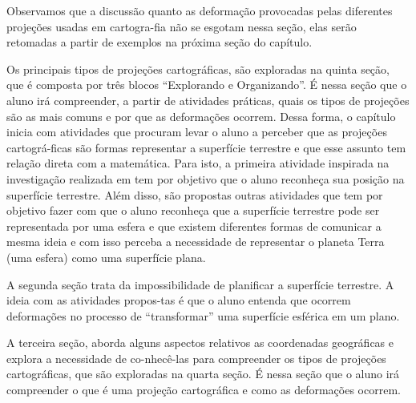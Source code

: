 \begin{apresentacao}
{Observamos que a discussão quanto as deformação provocadas pelas diferentes projeções usadas em cartogra-fia não se esgotam nessa seção, elas serão retomadas a partir de exemplos na próxima seção do capítulo.

Os principais tipos de projeções cartográficas, são exploradas na quinta seção, que é composta por três blocos “Explorando e Organizando”. É nessa seção que o aluno irá compreender, a partir de atividades práticas, quais os tipos de projeções são as mais comuns e por que as deformações ocorrem.
Dessa forma, o capítulo inicia com atividades que procuram levar o aluno a perceber que as projeções cartográ-ficas são formas representar a superfície terrestre e que esse assunto tem relação direta com a matemática. Para isto, a primeira atividade inspirada na investigação realizada em \cite{Nussbaum} tem por objetivo que o aluno reconheça sua posição na superfície terrestre. Além disso,  são propostas outras atividades que tem por objetivo fazer com que o aluno  reconheça que a superfície terrestre pode ser representada por uma esfera e  que existem diferentes formas de comunicar a mesma ideia e com isso perceba a necessidade de representar o planeta Terra (uma esfera) como uma superfície plana. 

A segunda seção trata da impossibilidade de planificar a superfície terrestre. A ideia com as atividades propos-tas é que o aluno entenda que ocorrem deformações no processo de “transformar” uma superfície esférica em um plano. 

A terceira seção, aborda alguns aspectos relativos as coordenadas geográficas e explora a necessidade de co-nhecê-las para compreender os tipos de projeções cartográficas, que são exploradas na quarta seção. É nessa seção que o aluno irá compreender o que é uma projeção cartográfica e como as deformações ocorrem.
}
\end{apresentacao}
\def\currentcolor{session1}
